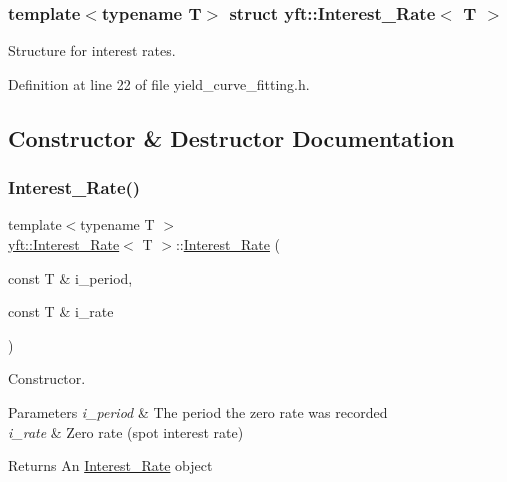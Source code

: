 \subsubsection*{template$<$typename T$>$\newline
struct yft\+::\+Interest\+\_\+\+Rate$<$ T $>$}

Structure for interest rates. 

Definition at line 22 of file yield\+\_\+curve\+\_\+fitting.\+h.



\subsection{Constructor \& Destructor Documentation}
\mbox{\label{structyft_1_1_interest___rate_a2ed60c2dd9b2823c2cfa3e1ae9066699}} 
\subsubsection{\texorpdfstring{Interest\+\_\+\+Rate()}{Interest\_Rate()}}
{\footnotesize\ttfamily template$<$typename T $>$ \\
\hyperlink{structyft_1_1_interest___rate}{yft\+::\+Interest\+\_\+\+Rate}$<$ T $>$\+::\hyperlink{structyft_1_1_interest___rate}{Interest\+\_\+\+Rate} (\begin{DoxyParamCaption}\item[{const T \&}]{i\+\_\+period,  }\item[{const T \&}]{i\+\_\+rate }\end{DoxyParamCaption})\hspace{0.3cm}{\ttfamily [inline]}}



Constructor. 


\begin{DoxyParams}{Parameters}
{\em i\+\_\+period} & The period the zero rate was recorded \\
\hline
{\em i\+\_\+rate} & Zero rate (spot interest rate) \\
\hline
\end{DoxyParams}
\begin{DoxyReturn}{Returns}
An \hyperlink{structyft_1_1_interest___rate}{Interest\+\_\+\+Rate} object 
\end{DoxyReturn}


